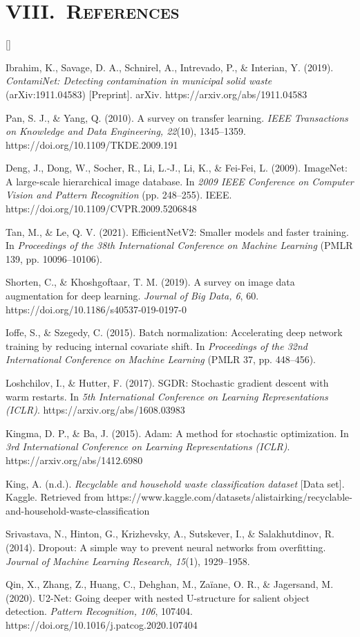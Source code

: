 \documentclass[10pt,twocolumn]{article}
\newenvironment{numrefs}
  {\section*{\centering\normalfont\fontsize{10}{12}\scshape VIII.\ References}
   \begin{list}{[\arabic{enumi}]}{%
      \usecounter{enumi}
      \setlength{\labelwidth}{2.2em}\setlength{\leftmargin}{2.4em}
      \setlength{\labelsep}{0.3em}\setlength{\itemsep}{2pt}\setlength{\parsep}{0pt}
      \footnotesize}}
  {\end{list}}
\begin{document}
\begin{numrefs}
\item Ibrahim, K., Savage, D. A., Schnirel, A., Intrevado, P., \& Interian, Y. (2019). \textit{ContamiNet: Detecting contamination in municipal solid waste} (arXiv:1911.04583) [Preprint]. arXiv. https://arxiv.org/abs/1911.04583
\item Pan, S. J., \& Yang, Q. (2010). A survey on transfer learning. \textit{IEEE Transactions on Knowledge and Data Engineering, 22}(10), 1345--1359. https://doi.org/10.1109/TKDE.2009.191
\item Deng, J., Dong, W., Socher, R., Li, L.-J., Li, K., \& Fei-Fei, L. (2009). ImageNet: A large-scale hierarchical image database. In \textit{2009 IEEE Conference on Computer Vision and Pattern Recognition} (pp. 248--255). IEEE. https://doi.org/10.1109/CVPR.2009.5206848
\item Tan, M., \& Le, Q. V. (2021). EfficientNetV2: Smaller models and faster training. In \textit{Proceedings of the 38th International Conference on Machine Learning} (PMLR 139, pp. 10096--10106).
\item Shorten, C., \& Khoshgoftaar, T. M. (2019). A survey on image data augmentation for deep learning. \textit{Journal of Big Data, 6}, 60. https://doi.org/10.1186/s40537-019-0197-0
\item Ioffe, S., \& Szegedy, C. (2015). Batch normalization: Accelerating deep network training by reducing internal covariate shift. In \textit{Proceedings of the 32nd International Conference on Machine Learning} (PMLR 37, pp. 448--456).
\item Loshchilov, I., \& Hutter, F. (2017). SGDR: Stochastic gradient descent with warm restarts. In \textit{5th International Conference on Learning Representations (ICLR)}. https://arxiv.org/abs/1608.03983
\item Kingma, D. P., \& Ba, J. (2015). Adam: A method for stochastic optimization. In \textit{3rd International Conference on Learning Representations (ICLR)}. https://arxiv.org/abs/1412.6980
\item King, A. (n.d.). \textit{Recyclable and household waste classification dataset} [Data set]. Kaggle. Retrieved from https://www.kaggle.com/datasets/alistairking/recyclable-and-household-waste-classification
\item Srivastava, N., Hinton, G., Krizhevsky, A., Sutskever, I., \& Salakhutdinov, R. (2014). Dropout: A simple way to prevent neural networks from overfitting. \textit{Journal of Machine Learning Research, 15}(1), 1929--1958.
\item Qin, X., Zhang, Z., Huang, C., Dehghan, M., Zaïane, O. R., \& Jagersand, M. (2020). U2-Net: Going deeper with nested U-structure for salient object detection. \textit{Pattern Recognition, 106}, 107404. https://doi.org/10.1016/j.patcog.2020.107404

\end{numrefs}
\end{document}
